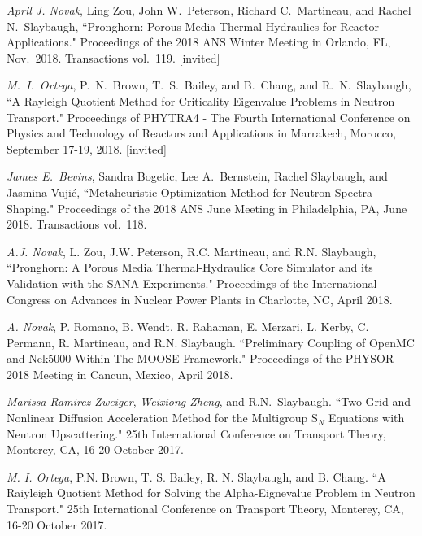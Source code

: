 \begin{bibsection}
\item \textit{April J. Novak}, Ling Zou, John W.\ Peterson, Richard C.\ Martineau, and Rachel N.\ Slaybaugh, ``Pronghorn: Porous Media Thermal-Hydraulics for Reactor Applications." Proceedings of the 2018 ANS Winter Meeting in Orlando, FL, Nov.\ 2018. Transactions vol.\ 119. [invited]

\item \textit{M.\ I.\ Ortega}, P.\ N.\ Brown, T.\ S.\ Bailey, and B.\ Chang, and R.\ N.\ Slaybaugh, ``A Rayleigh Quotient Method for Criticality Eigenvalue Problems in Neutron Transport." Proceedings of PHYTRA4 - The Fourth International Conference on Physics and Technology of Reactors and Applications in Marrakech, Morocco, September 17-19, 2018. [invited]

\item \textit{James E.\ Bevins}, Sandra Bogetic, Lee A.\ Bernstein, Rachel Slaybaugh, and Jasmina Vuji\'c, ``Metaheuristic Optimization Method for Neutron Spectra Shaping." Proceedings of the 2018 ANS June Meeting in Philadelphia, PA, June 2018. Transactions vol.\ 118. 

\item \textit{A.J. Novak}, L. Zou, J.W. Peterson, R.C. Martineau, and R.N. Slaybaugh,
``Pronghorn: A Porous Media Thermal-Hydraulics Core Simulator and its Validation with the SANA Experiments." Proceedings of the International Congress on Advances in Nuclear Power Plants in Charlotte, NC, April 2018. 

\item \textit{A. Novak}, P. Romano, B. Wendt, R. Rahaman, E. Merzari, L. Kerby, C. Permann, R. Martineau, and R.N. Slaybaugh. ``Preliminary Coupling of OpenMC and Nek5000 Within The MOOSE Framework." Proceedings of the PHYSOR 2018 Meeting in Cancun, Mexico, April 2018. 

\item  \textit{Marissa Ramirez Zweiger}, \textit{Weixiong Zheng}, and R.N.\ Slaybaugh. ``Two-Grid and Nonlinear Diffusion Acceleration Method for the Multigroup S$_N$ Equations with Neutron Upscattering." 25th International Conference on Transport Theory, Monterey, CA, 16-20 October 2017.

\item \textit{M. I. Ortega}, P.N. Brown, T. S. Bailey, R. N. Slaybaugh, and B. Chang. ``A Raiyleigh Quotient Method for Solving the Alpha-Eignevalue Problem in Neutron Transport." 25th International Conference on Transport Theory, Monterey, CA, 16-20 October 2017.


\end{bibsection}
